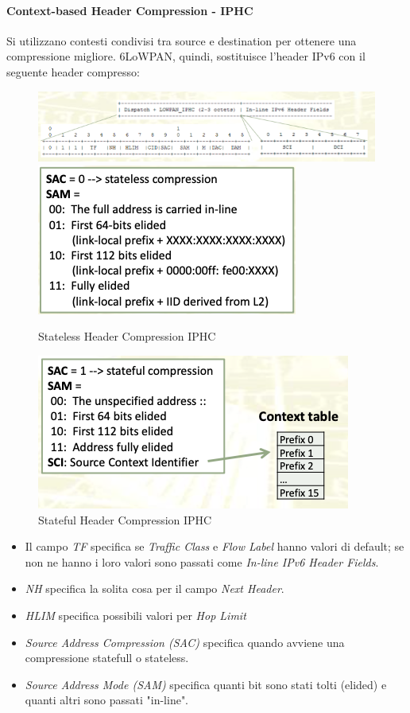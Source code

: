 \documentclass{article}
\begin{document}
\paragraph{Context-based Header Compression - IPHC}
Si utilizzano contesti condivisi tra source e destination per ottenere una compressione migliore. 6LoWPAN, quindi, sostituisce l'header IPv6 con il seguente header compresso:
\begin{figure}[H]
\centering
\includegraphics[scale=0.4]{figures/compressed header 6lowpan.png}
\includegraphics[scale=0.4]{figures/compressed header stateless 6lowpan.png}
\caption{Stateless Header Compression IPHC}
\end{figure}
\begin{figure}[H]
\centering
\includegraphics[scale=0.4]{figures/compressed header stateful 6lowpan.png}
\caption{Stateful Header Compression IPHC}
\end{figure}
\begin{itemize}
    \item Il campo \textit{TF} specifica se \textit{Traffic Class} e \textit{Flow Label} hanno valori di default; se non ne hanno i loro valori sono passati come \textit{In-line IPv6 Header Fields}.
    \item \textit{NH} specifica la solita cosa per il campo \textit{Next Header}.
    \item \textit{HLIM} specifica possibili valori per \textit{Hop Limit}
    \item \textit{Source Address Compression (SAC)} specifica quando avviene una compressione statefull o stateless.
    \item \textit{Source Address Mode (SAM)} specifica quanti bit sono stati tolti (elided) e quanti altri sono passati "in-line".
\end{itemize}
\end{document}
